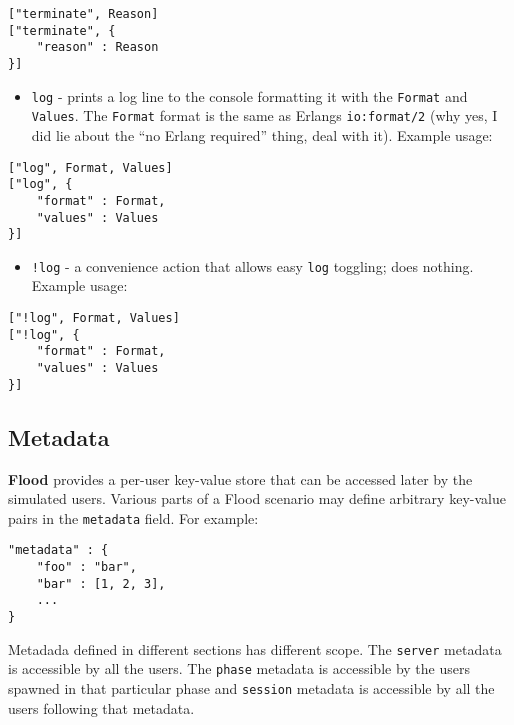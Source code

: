 \documentclass[a4paper]{article}
\begin{document}
\begin{verbatim}
["terminate", Reason]
["terminate", {
    "reason" : Reason
}]
\end{verbatim}





\begin{itemize}
\item \texttt{log} - prints a log line to the console formatting it with the \texttt{Format} and \texttt{Values}. The \texttt{Format} format is the same as Erlangs \texttt{io:format/2} (why yes, I did lie about the ``no Erlang required'' thing, deal with it). Example usage:
\end{itemize}

\begin{verbatim}
["log", Format, Values]
["log", {
    "format" : Format,
    "values" : Values
}]
\end{verbatim}





\begin{itemize}
\item \texttt{!log} - a convenience action that allows easy \texttt{log} toggling; does nothing. Example usage:
\end{itemize}

\begin{verbatim}
["!log", Format, Values]
["!log", {
    "format" : Format,
    "values" : Values
}]
\end{verbatim}
\subsection{Metadata}
\label{sec-3-6}
\label{ref-metadata}


\textbf{Flood} provides a per-user key-value store that can be accessed later by the simulated users. Various parts of a Flood scenario may define arbitrary key-value pairs in the \texttt{metadata} field. For example:


\begin{verbatim}
"metadata" : {
    "foo" : "bar",
    "bar" : [1, 2, 3],
    ...
}
\end{verbatim}




\noindent
Metadada defined in different sections has different scope. The \texttt{server} metadata is accessible by all the users. The \texttt{phase} metadata is accessible by the users spawned in that particular phase and \texttt{session} metadata is accessible by all the users following that metadata.
\end{document}
